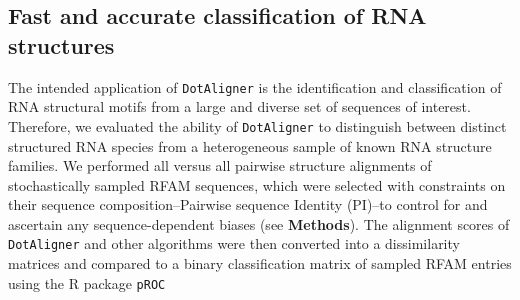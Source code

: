\documentclass[a4paper,11pt]{article}
\newcommand\dotaligner{\texttt{DotAligner}}
\begin{document}
\subsection*{ Fast and accurate classification of RNA structures  } 

The intended application of \dotaligner{}  is the identification and
classification of RNA structural motifs from a large and diverse set of sequences of interest. 
Therefore, we evaluated the ability of \dotaligner{} to distinguish between distinct structured 
RNA species from a heterogeneous sample of known RNA structure families. 
We performed all versus all pairwise structure alignments of stochastically sampled RFAM sequences, 
which were selected with constraints on their sequence composition--Pairwise sequence Identity (PI)--to 
control for and ascertain any sequence-dependent biases (see \textbf{Methods}). The alignment scores 
of \dotaligner{} and other algorithms were then converted into a dissimilarity matrices and 
compared to a binary classification matrix of sampled RFAM entries using the R package \texttt{pROC}
\end{document}
